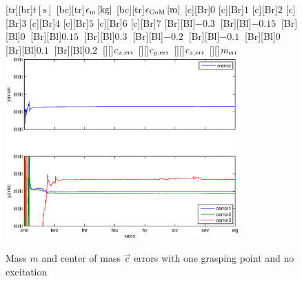 \begin{figure}
	\centering	
	[tr][br]{$t\left[\mathrm{s}\right]$}
	[bc][tr]{$\epsilon_{\mathrm{m}}\left[\mathrm{kg}\right]$}
	[bc][tr]{$\epsilon_{\mathrm{CoM}}\left[\mathrm{m}\right]$}
	[Br]{$0$}
	[Br]{$1$}
	[Br]{$2$}
	[Br]{$3$}
	[Br]{$4$}
	[Br]{$5$}
	[Br]{$6$}
	[Br]{$7$}
	[Br][Bl]{$-0.3\  $}
	[Br][Bl]{$-0.15\ $}
	[Br][Bl]{$0\  $}
	[Br][Bl]{$0.15\  $}
	[Br][Bl]{$0.3\  $}
	[Br][Bl]{$-0.2\  $}
	[Br][Bl]{$-0.1\ $}
	[Br][Bl]{$0\  $}
	[Br][Bl]{$0.1\  $}
	[Br][Bl]{$0.2\  $}
	[][]{\tiny $c_{x,\mathrm{err}}$}
	[][]{\tiny $c_{y,\mathrm{err}}$}
	[][]{\tiny $c_{z,\mathrm{err}}$}
	[][]{\tiny $m_{\mathrm{err}}$}
	\includegraphics[width=0.8\textwidth]{figures/one_grasping_point_no_movement_mass_and_cog.eps}
	\vspace{0.2cm}
	\caption[Mass error, one grasping point, no excitation]{Mass $m$ and center of mass $\vec{c}$ errors with one grasping point and no excitation}
	\label{fig:estim_mass_one_no_movement}
\end{figure}

